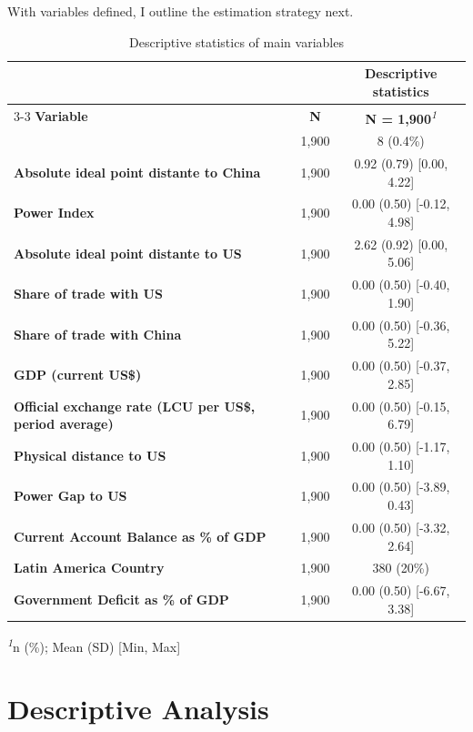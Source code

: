 \documentclass[
  12pt,
]{article}
\begin{document}
With variables defined, I outline the estimation strategy next.

\begin{table}[t]
\caption{\label{tab:table_summary}Descriptive statistics of main variables} 
\fontsize{12.0pt}{14.4pt}\selectfont
\begin{tabular*}{\linewidth}{@{\extracolsep{\fill}}lcc}
\toprule
 &  & \textbf{Descriptive statistics} \\ 
\cmidrule(lr){3-3}
\textbf{Variable} & \textbf{N} & \textbf{N = 1,900}\textsuperscript{\textit{1}} \\ 
\midrule\addlinespace[2.5pt]
{\bfseries Treatment} & 1,900 & 8 (0.4\%) \\ 
{\bfseries Absolute ideal point distante to China} & 1,900 & 0.92 (0.79) [0.00, 4.22] \\ 
{\bfseries Power Index} & 1,900 & 0.00 (0.50) [-0.12, 4.98] \\ 
{\bfseries Absolute ideal point distante to US} & 1,900 & 2.62 (0.92) [0.00, 5.06] \\ 
{\bfseries Share of trade with US} & 1,900 & 0.00 (0.50) [-0.40, 1.90] \\ 
{\bfseries Share of trade with China} & 1,900 & 0.00 (0.50) [-0.36, 5.22] \\ 
{\bfseries GDP (current US\$)} & 1,900 & 0.00 (0.50) [-0.37, 2.85] \\ 
{\bfseries Official exchange rate (LCU per US\$, period average)} & 1,900 & 0.00 (0.50) [-0.15, 6.79] \\ 
{\bfseries Physical distance to US} & 1,900 & 0.00 (0.50) [-1.17, 1.10] \\ 
{\bfseries Power Gap to US} & 1,900 & 0.00 (0.50) [-3.89, 0.43] \\ 
{\bfseries Current Account Balance as \% of GDP} & 1,900 & 0.00 (0.50) [-3.32, 2.64] \\ 
{\bfseries Latin America Country} & 1,900 & 380 (20\%) \\ 
{\bfseries Government Deficit as \% of GDP} & 1,900 & 0.00 (0.50) [-6.67, 3.38] \\ 
\bottomrule
\end{tabular*}
\begin{minipage}{\linewidth}
\textsuperscript{\textit{1}}n (\%); Mean (SD) {[}Min, Max{]}\\
\end{minipage}
\end{table}

\section{Descriptive Analysis}\label{descriptive-analysis}
\end{document}
